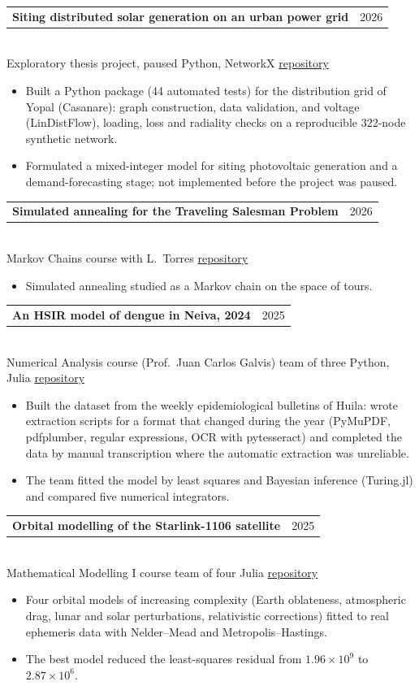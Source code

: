 \documentclass[11pt,a4paper]{article}
\makeatletter
\newcommand{\entry}[3]{%
  \begin{tabularx}{\textwidth}{@{}>{\raggedright\arraybackslash}X@{\hspace{1em}}r@{}}
    \textbf{#1} & {\color{gris}#2}
  \end{tabularx}\\
  {\color{gris}\small #3}\par\vspace{2pt}}
\makeatother
\begin{document}
\entry{Siting distributed solar generation on an urban power grid}{2026}{Exploratory thesis project,
  paused \textperiodcentered{} Python, NetworkX \textperiodcentered{} \href{https://github.com/Henry2899/pvgraph}{repository}}
\begin{itemize}
  \item Built a Python package (44 automated tests) for the distribution grid of Yopal (Casanare):
        graph construction, data validation, and voltage (LinDistFlow), loading, loss and radiality
        checks on a reproducible 322-node synthetic network.
  \item Formulated a mixed-integer model for siting photovoltaic generation and a demand-forecasting
        stage; not implemented before the project was paused.
\end{itemize}

\entry{Simulated annealing for the Traveling Salesman Problem}{2026}{Markov Chains course
  \textperiodcentered{} with L.\ Torres \textperiodcentered{}
  \href{https://github.com/Henry2899/cadenas-markov-aplicaciones}{repository}}
\begin{itemize}
  \item Simulated annealing studied as a Markov chain on the space of tours.
\end{itemize}

\entry{An HSIR model of dengue in Neiva, 2024}{2025}{Numerical Analysis course (Prof.\ Juan Carlos
  Galvis) \textperiodcentered{} team of three \textperiodcentered{} Python, Julia \textperiodcentered{}
  \href{https://github.com/Henry2899/dengue-hsir-neiva}{repository}}
\begin{itemize}
  \item Built the dataset from the weekly epidemiological bulletins of Huila: wrote extraction
        scripts for a format that changed during the year (PyMuPDF, pdfplumber, regular expressions,
        OCR with pytesseract) and completed the data by manual transcription where the automatic
        extraction was unreliable.
  \item The team fitted the model by least squares and Bayesian inference (Turing.jl) and compared
        five numerical integrators.
\end{itemize}

\entry{Orbital modelling of the Starlink-1106 satellite}{2025}{Mathematical Modelling I course
  \textperiodcentered{} team of four \textperiodcentered{} Julia \textperiodcentered{}
  \href{https://github.com/Henry2899/starlink-1106-orbit}{repository}}
\begin{itemize}
  \item Four orbital models of increasing complexity (Earth oblateness, atmospheric drag, lunar and
        solar perturbations, relativistic corrections) fitted to real ephemeris data with
        Nelder--Mead and Metropolis--Hastings.
  \item The best model reduced the least-squares residual from $1.96\times10^{9}$ to
        $2.87\times10^{6}$.
\end{itemize}
\end{document}
